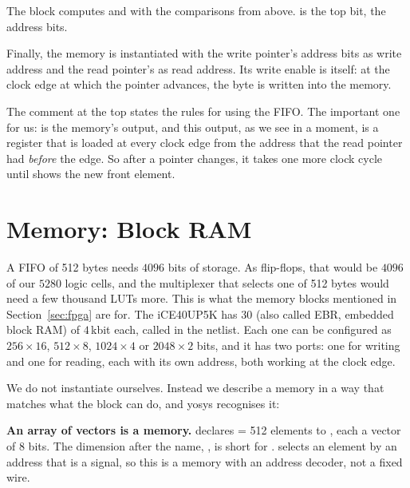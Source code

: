 The  block computes  and  with the
comparisons from above.  is the top bit, \cc{[ADDRW-1:0]}
the address bits.

Finally, the memory  is instantiated with the write pointer's
address bits as write address and the read pointer's as read address. Its
write enable is  itself: at the clock edge at which the pointer
advances, the byte is written into the memory.

The comment at the top states the rules for using the FIFO. The important one
for us:  is the memory's output, and this output, as we see in a
moment, is a register that is loaded at every clock edge from the address that
the read pointer had \emph{before} the edge. So after a pointer changes, it
takes one more clock cycle until  shows the new front element.

\section{Memory: Block RAM}
\label{sec:step07-bram}

A FIFO of 512 bytes needs $4096$ bits of storage. As flip-flops, that would
be $4096$ of our $5280$ logic cells, and the multiplexer that selects one of
512 bytes would need a few thousand LUTs more. This is what the memory blocks
mentioned in Section~\ref{sec:fpga} are for. The iCE40UP5K has 30
 (also called EBR, embedded block RAM) of $4$\,kbit each,
called  in the netlist. Each one can be configured as
$256 \times 16$, $512 \times 8$, $1024 \times 4$ or $2048 \times 2$ bits, and
it has two ports: one for writing and one for reading, each with its own
address, both working at the clock edge.

We do not instantiate  ourselves. Instead we describe a memory
in a way that matches what the block can do, and yosys recognises it:


\textbf{An array of vectors is a memory.} 
declares  = 512 elements  to , each a vector
of 8 bits. The dimension after the name, \cc{[DEPTH]}, is short for
\cc{[0:DEPTH-1]}.  selects an element by an address that is
a signal, so this is a memory with an address decoder, not a fixed wire.

